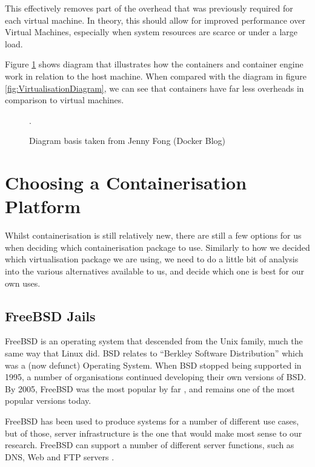 This effectively removes part of the overhead that was previously required for each virtual machine. In theory, this should allow for improved performance over Virtual Machines, especially when system resources are scarce or under a large load.

Figure \ref{fig:ContainerDiagram} shows diagram that illustrates how the containers and container engine work in relation to the host machine. When compared with the diagram in figure \ref{fig:VirtualisationDiagram}, we can see that containers have far less overheads in comparison to virtual machines.

\begin{figure}[H]
\caption{Diagram basis taken from Jenny Fong (Docker Blog)\citep{ContainerDiagram}}.
\label{fig:ContainerDiagram}
\centering
\end{figure}

\section{Choosing a Containerisation Platform}
Whilst containerisation is still relatively new, there are still a few options for us when deciding which containerisation package to use. Similarly to how we decided which virtualisation package we are using, we need to do a little bit of analysis into the various alternatives available to us, and decide which one is best for our own uses.


\subsection{FreeBSD Jails}
FreeBSD is an operating system that descended from the Unix family, much the same way that Linux did. BSD relates to ``Berkley Software Distribution'' which was a (now defunct) Operating System. When BSD stopped being supported in 1995, a number of organisations continued developing their own versions of BSD. By 2005, FreeBSD was the most popular by far \citep{BSDSurvey}, and remains one of the most popular versions today.

FreeBSD has been used to produce systems for a number of different use cases, but of those, server infrastructure is the one that would make most sense to our research. FreeBSD can support a number of different server functions, such as DNS, Web and FTP servers \citep[Section 1.2.1.]{FreeBSDHandbook}.

